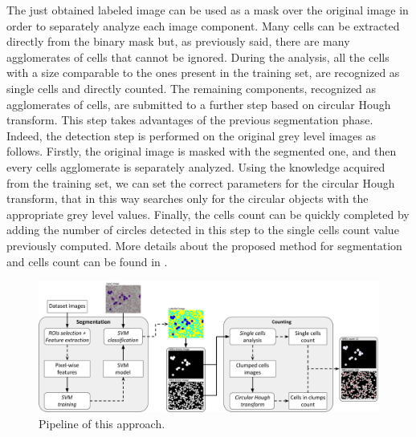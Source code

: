 \documentclass[final,a4paper,12pt,english]{UnicaPhdThesis3}
\begin{document}
{The just obtained labeled image can be used as a mask over the original image in order to separately analyze each image component. Many cells can be extracted directly from the binary mask but, as previously said, there are many agglomerates of cells that cannot be ignored. During the analysis, all the cells with a size comparable to the ones present in the training set, are recognized as single cells and directly counted. The remaining components, recognized as agglomerates of cells, are submitted to a further step based on circular Hough transform. This step takes advantages of the previous segmentation phase. Indeed, the detection step is performed on the original grey level images as follows. Firstly, the original image is masked with the segmented one, and then every cells agglomerate is separately analyzed. Using the knowledge acquired from the training set, we can set the correct parameters for the circular Hough transform, that in this way searches only for the circular objects with the appropriate grey level values. Finally, the cells count can be quickly completed by adding the number of circles detected in this step to the single cells count value previously computed. More details about the proposed method for segmentation and cells count can be found in \cite{DiRuberto2016}.

\begin{figure}[h]
	\centering
	\includegraphics[height=0.39\textwidth]{images/2016_2_sitis/Schema}
	\caption{\label{fig:Schema}Pipeline of this approach.}
\end{figure}

}
\end{document}
